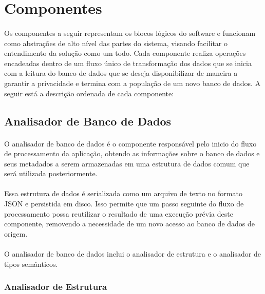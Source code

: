 \section{Componentes}

\paragraph{} Os componentes a seguir representam os blocos lógicos do software e funcionam como abstrações de alto nível das partes do sistema, visando facilitar o entendimento da solução como um todo. Cada componente realiza operações encadeadas dentro de um fluxo único de transformação dos dados que se inicia com a leitura do banco de dados que se deseja disponibilizar de maneira a garantir a privacidade e termina com a população de um novo banco de dados. A seguir está a descrição ordenada de cada componente:

\subsection{Analisador de Banco de Dados}

\paragraph{} O analisador de banco de dados é o componente responsável pelo inicio do fluxo de processamento da aplicação, obtendo as informações sobre o banco de dados e seus metadados a serem armazenadas em uma estrutura de dados comum que será utilizada posteriormente.

\paragraph{} Essa estrutura de dados é serializada como um arquivo de texto no formato JSON e persistida em disco. Isso permite que um passo seguinte do fluxo de processamento possa reutilizar o resultado de uma execução prévia deste componente, removendo a necessidade de um novo acesso ao banco de dados de origem.

\paragraph{} O analisador de banco de dados inclui o analisador de estrutura e o analisador de tipos semânticos.

\subsubsection{Analisador de Estrutura}

